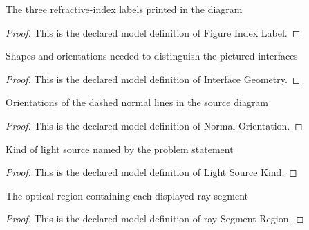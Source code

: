 \begin{definition}
  \label{def:physics:phyx-mini-0155:phyxminiproblems-problemphyxmini0155-figureindexlabel}
  The three refractive-index labels printed in the diagram
\end{definition}
\begin{proof}
  This is the declared model definition of Figure Index Label.
\end{proof}
\begin{definition}
  \label{def:physics:phyx-mini-0155:phyxminiproblems-problemphyxmini0155-interfacegeometry}
  Shapes and orientations needed to distinguish the pictured interfaces
\end{definition}
\begin{proof}
  This is the declared model definition of Interface Geometry.
\end{proof}
\begin{definition}
  \label{def:physics:phyx-mini-0155:phyxminiproblems-problemphyxmini0155-normalorientation}
  Orientations of the dashed normal lines in the source diagram
\end{definition}
\begin{proof}
  This is the declared model definition of Normal Orientation.
\end{proof}
\begin{definition}
  \label{def:physics:phyx-mini-0155:phyxminiproblems-problemphyxmini0155-lightsourcekind}
  Kind of light source named by the problem statement
\end{definition}
\begin{proof}
  This is the declared model definition of Light Source Kind.
\end{proof}
\begin{definition}
  \label{def:physics:phyx-mini-0155:phyxminiproblems-problemphyxmini0155-raysegmentregion}
  The optical region containing each displayed ray segment
\end{definition}
\begin{proof}
  This is the declared model definition of ray Segment Region.
\end{proof}
